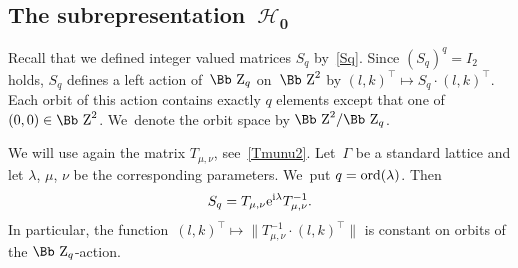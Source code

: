 \documentclass[10pt,a4paper]{amsart}
\newcommand\ZZ{{\mbox{\Bb Z}}}
\newcommand\cH{{\mathcal H}}
\newcommand{\ord}{{\rm ord}}
\numberwithin{equation}{section}
\begin{document}
%
\subsection[The subrepresentation~$\cH_0$]{The subrepresentation~$\boldsymbol{\cH_0}$}
Recall that we defined integer valued matrices $S_q$ by~\eqref{Sq}. Since $(S_q)^q=I_2$ holds, $S_q$ defines a left action of~$\ZZ_q$ on~$\ZZ^2$ by $(l,k)^\top\mapsto S_q\cdot(l,k)^\top$. Each orbit of this action contains exactly $q$ elements except that one of~$(0,0)\in\ZZ^2$. We~denote the orbit space by $\ZZ^2/\ZZ_q$.

We will use again the matrix $T_{\mu,\nu}$, see~\eqref{Tmunu2}. Let~$\Gamma$ be a standard lattice and let $\lambda$, $\mu$, $\nu$ be the corresponding parameters. We~put $q=\ord(\lambda)$. Then
\begin{gather}\label{sq}
S_q=T_{\mu,\nu}{\rm e}^{{\rm i}\lambda}T_{\mu,\nu}^{-1}.
\end{gather}
In particular, the function~$(l,k)^\top\mapsto \big\|T_{\mu,\nu}^{-1}\cdot(l,k)^\top\big\|$ is constant on orbits of the $\ZZ_q$-action.
\end{document}
